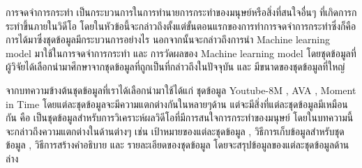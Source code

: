 การจดจำการกระทำ เป็นกระบวนการในการทำนายการกระทำของมนุษย์หรือสิ่งที่สนใจอื่นๆ ที่เกิดการกระทำขึ้นภายในวิดีโอ โดยในหัวข้อนี้จะกล่าวถึงตั้งแต่ขั้นตอนแรกของการทำการจดจำการกระทำซึ่งก็คือ การได้มาซึ่งชุดข้อมูลมีกระบวนการอย่างไร นอกจากนั้นจะกล่าวถึงการนำ Machine learning model มาใช้ในการจดจำการกระทำ และ การวัดผลของ Machine learning model โดยชุดข้อมูลที่ผู้วิจัยได้เลือกนำมาศึกษาจากชุดข้อมูลที่ถูกเป็นที่กล่าวถึงในปัจจุบัน และ มีขนาดของชุดข้อมูลที่ใหญ่ 
\par
จากบทความข้างต้นชุดข้อมูลที่เราได้เลือกนำมาใช้ได้แก่ ชุดข้อมูล Youtube-8M , AVA , Moment in Time โดยแต่ละชุดข้อมูลจะมีความแตกต่างกันในหลายๆด้าน แต่จะมีสิ่งที่แต่ละชุดข้อมูลมีเหมือนกัน คือ เป็นชุดข้อมูลสำหรับการวิเคราะห์ผลวิดีโอที่มีการสนใจการกระทำของมนุษย์ โดยในบทความนี้จะกล่าวถึงความแตกต่างในด้านต่างๆ เช่น เป้าหมายของแต่ละชุดข้อมูล , วิธีการเก็บข้อมูลสำหรับชุดข้อมูล , วิธีการสร้างคำอธิบาย และ รายละเอียดของชุดข้อมูล โดยจะสรุปข้อมูลของแต่ละชุดข้อมูลด้านล่าง

